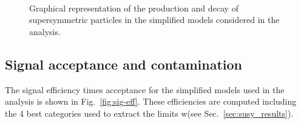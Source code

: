 \begin{figure}[h!]
  \begin{center}
     ~~
     ~~
     \\
    \caption{
      Graphical representation of the production and decay of supersymmetric particles in the 
      simplified models considered in the analysis. 
    }
    \label{fig:simplified-models}
  \end{center}
\end{figure}



\subsection{Signal acceptance and contamination}
\label{sec:sig-accept-contam}
The signal efficiency times acceptance for the simplified models used in the analysis 
is shown in Fig.~\ref{fig:sig-eff}. 
These efficiencies are computed including the 4 best categories used to extract the limits w(see Sec.~\ref{sec:susy_results}).

